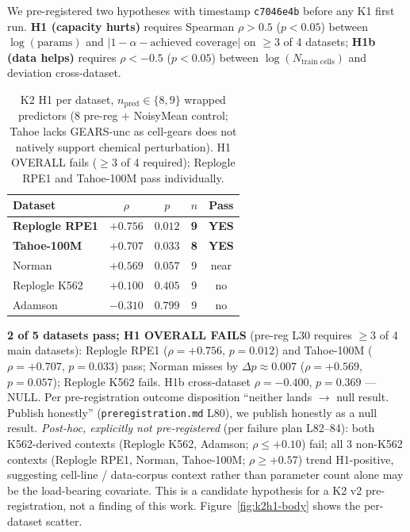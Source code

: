 \documentclass{article}
\begin{document}
We pre-registered two hypotheses with timestamp \texttt{c7046e4b} before any K1 first run. \textbf{H1 (capacity hurts)} requires Spearman $\rho > 0.5$ ($p < 0.05$) between $\log(\text{params})$ and $|1 - \alpha - \text{achieved coverage}|$ on $\geq 3$ of 4 datasets; \textbf{H1b (data helps)} requires $\rho < -0.5$ ($p < 0.05$) between $\log(N_{\text{train cells}})$ and deviation cross-dataset.

\begin{table}[h]
\caption{K2 H1 per dataset, $n_{\text{pred}} \in \{8, 9\}$ wrapped predictors (8 pre-reg + NoisyMean control; Tahoe lacks GEARS-unc as cell-gears does not natively support chemical perturbation). H1 OVERALL fails ($\geq 3$ of 4 required); Replogle RPE1 and Tahoe-100M pass individually.}
\label{tab:k2}
\vskip 0.05in
\centering
\small
\begin{tabular}{lcccc}
\toprule
Dataset & $\rho$ & $p$ & $n$ & Pass \\
\midrule
\textbf{Replogle RPE1} & $\mathbf{+0.756}$ & $\mathbf{0.012}$ & \textbf{9} & \textbf{YES} \\
\textbf{Tahoe-100M}    & $\mathbf{+0.707}$ & $\mathbf{0.033}$ & \textbf{8} & \textbf{YES} \\
Norman                 & $+0.569$ & $0.057$ & 9 & near \\
Replogle K562          & $+0.100$ & $0.405$ & 9 & no   \\
Adamson                & $-0.310$ & $0.799$ & 9 & no   \\
\bottomrule
\end{tabular}
\vskip -0.05in
\end{table}

\textbf{2 of 5 datasets pass; H1 OVERALL FAILS} (pre-reg L30 requires $\geq 3$ of 4 main datasets): Replogle RPE1 ($\rho{=}{+}0.756$, $p{=}0.012$) and Tahoe-100M ($\rho{=}{+}0.707$, $p{=}0.033$) pass; Norman misses by $\Delta p{\approx}0.007$ ($\rho{=}{+}0.569$, $p{=}0.057$); Replogle K562 fails. H1b cross-dataset $\rho = -0.400$, $p = 0.369$ --- NULL. Per pre-registration outcome disposition ``neither lands $\to$ null result. Publish honestly'' (\texttt{preregistration.md} L80), we publish honestly as a null result. \emph{Post-hoc, explicitly not pre-registered} (per failure plan L82--84): both K562-derived contexts (Replogle K562, Adamson; $\rho \leq +0.10$) fail; all 3 non-K562 contexts (Replogle RPE1, Norman, Tahoe-100M; $\rho \geq +0.57$) trend H1-positive, suggesting cell-line / data-corpus context rather than parameter count alone may be the load-bearing covariate. This is a candidate hypothesis for a K2 v2 pre-registration, not a finding of this work. Figure~\ref{fig:k2h1-body} shows the per-dataset scatter.
\end{document}
